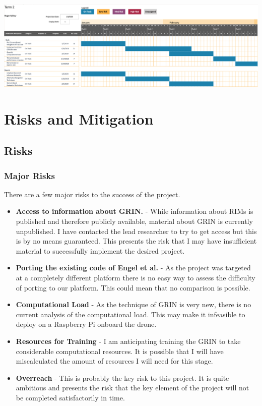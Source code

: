 \documentclass[]{../resources/final_report}
\begin{document}
\vspace{20pt}

\includegraphics[width=\textwidth]{../resources/images/Term2GanttChart.png}


\chapter{Risks and Mitigation}

\section{Risks}
\subsection{Major Risks}

There are a few major risks to the success of the project.

\begin{itemize}
  \item \textbf{Access to information about GRIN.} - While information about RIMs is published and therefore publicly available, material about GRIN is currently unpublished. I have contacted the lead researcher to try to get access but this is by no means guaranteed. This presents the risk that I may have insufficient material to successfully implement the desired project.
  \item \textbf{Porting the existing code of Engel et al.} - As the project was targeted at a completely different platform there is no easy way to assess the difficulty of porting to our platform. This could mean that no comparison is possible.
  \item \textbf{Computational Load} - As the technique of GRIN is very new, there is no current analysis of the computational load. This may make it infeasible to deploy on a Raspberry Pi onboard the drone.
  \item \textbf{Resources for Training} - I am anticipating training the GRIN to take considerable computational resources. It is possible that I will have miscalculated the amount of resources I will need for this stage.
  \item \textbf{Overreach} - This is probably the key risk to this project. It is quite ambitious and presents the risk that the key element of the project will not be completed satisfactorily in time.
\end{itemize}
\end{document}
